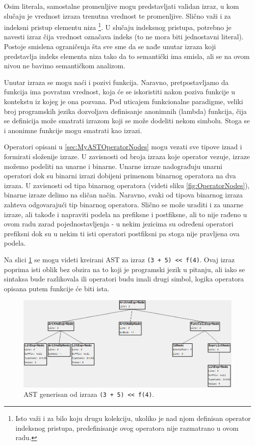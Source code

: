 Osim literala, samostalne promenljive mogu predstavljati validan izraz, u kom slučaju je vrednost izraza trenutna vrednost te promenljive. Slično važi i za indeksni pristup elementu niza \footnote{Isto važi i za bilo koju drugu kolekciju, ukoliko je nad njom definisan operator indeksnog pristupa, predefinisanje ovog operatora nije razmatrano u ovom radu.}. U slučaju indeksnog pristupa, potrebno je navesti izraz čija vrednost označava indeks (to ne mora biti jednostavni literal). Postoje smislena ograničenja šta sve sme da se nađe unutar izraza koji predstavlja indeks elementa niza tako da to semantički ima smisla, ali se na ovom nivou ne bavimo semantičkom analizom. 

Unutar izraza se mogu naći i pozivi funkcija. Naravno, pretpostavljamo da funkcija ima povratnu vrednost, koja će se iskoristiti nakon poziva funkcije u kontekstu iz kojeg je ona pozvana. Pod uticajem funkcionalne paradigme, veliki broj programskih jezika dozvoljava definisanje anonimnih (lambda) funkcija, čija se definicija može smatrati izrazom koji se može dodeliti nekom simbolu. Stoga se i anonimne funkcije mogu smatrati kao izrazi. 

Operatori opisani u \ref{sec:MyASTOperatorNodes} mogu vezati sve tipove iznad i formirati složenije izraze. U zavisnosti od broja izraza koje operator vezuje, izraze možemo podeliti na unarne i binarne. Unarne izraze nadograđuju unarni operatori dok su binarni izrazi dobijeni primenom binarnog operatora na dva izraza. U zavisnosti od tipa binarnog operatora (videti sliku \ref{fig:OperatorNodes}), binarne izraze delimo na sličan način. Naravno, svaki od tipova binarnog izraza zahteva odgovarajući tip binarnog operatora. Slično se može uraditi i za unarne izraze, ali takođe i napraviti podela na prefiksne i postfiksne, ali to nije rađeno u ovom radu zarad pojednostavljenja - u nekim jezicima su određeni operatori prefiksni dok su u nekim ti isti operatori postfiksni pa stoga nije pravljena ova podela.

Na slici \ref{fig:MyASTExampleExpressions} se mogu videti kreirani AST za izraz \texttt{(3 + 5) << f(4)}. Ovaj izraz poprima isti oblik bez obzira na to koji je programski jezik u pitanju, ali iako se sintaksa bude razlikovala ili operatori budu imali drugi simbol, logika operatora opisana putem funkcije će biti ista.

\begin{figure}[h!]
\centering
\includegraphics[scale=0.6]{images/ast_expr.png}
\caption{AST generisan od izraza \texttt{(3 + 5) << f(4)}.}
\label{fig:MyASTExampleExpressions}
\end{figure}
